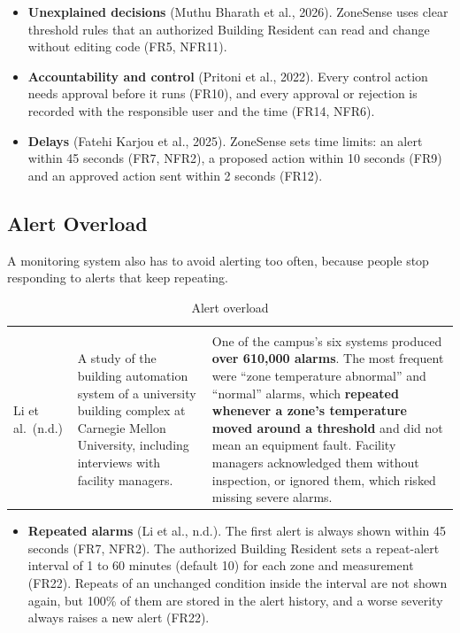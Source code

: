 \documentclass[11pt,a4paper]{article}
\begin{document}
\begin{itemize}
\item \textbf{Unexplained decisions} (Muthu Bharath et al., 2026). ZoneSense uses clear threshold rules that an authorized Building Resident can read and change without editing code (FR5, NFR11).
\item \textbf{Accountability and control} (Pritoni et al., 2022). Every control action needs approval before it runs (FR10), and every approval or rejection is recorded with the responsible user and the time (FR14, NFR6).
\item \textbf{Delays} (Fatehi Karjou et al., 2025). ZoneSense sets time limits: an alert within 45 seconds (FR7, NFR2), a proposed action within 10 seconds (FR9) and an approved action sent within 2 seconds (FR12).
\end{itemize}

\subsection{Alert Overload}
A monitoring system also has to avoid alerting too often, because people stop responding to alerts that keep repeating.

{\small\stripe
\begin{xltabular}{\linewidth}{|L{3.2cm}|L{5.4cm}|Y|}
\caption{Alert overload}\label{tab:alerts}\\
\hline\headrow
{} &  & \\\hline
\endfirsthead
\hline\headrow
{} &  & \\\hline
\endhead
Li et al.\ (n.d.) & A study of the building automation system of a university building complex at Carnegie Mellon University, including interviews with facility managers. & One of the campus's six systems produced \textbf{over 610,000 alarms}. The most frequent were ``zone temperature abnormal'' and ``normal'' alarms, which \textbf{repeated whenever a zone's temperature moved around a threshold} and did not mean an equipment fault. Facility managers acknowledged them without inspection, or ignored them, which risked missing severe alarms.\\\hline
\end{xltabular}}

\begin{itemize}
\item \textbf{Repeated alarms} (Li et al., n.d.). The first alert is always shown within 45 seconds (FR7, NFR2). The authorized Building Resident sets a repeat-alert interval of 1 to 60 minutes (default 10) for each zone and measurement (FR22). Repeats of an unchanged condition inside the interval are not shown again, but 100\% of them are stored in the alert history, and a worse severity always raises a new alert (FR22).
\end{itemize}
\end{document}

